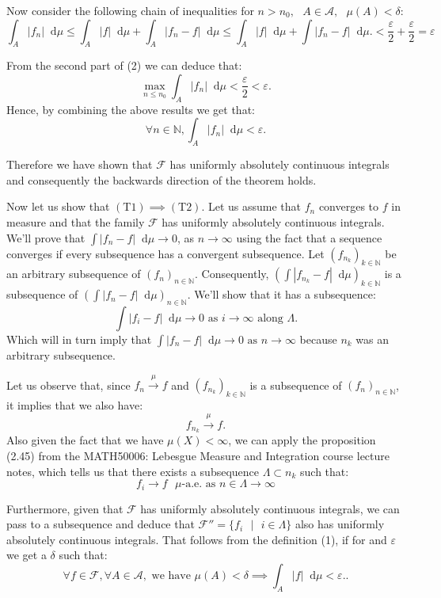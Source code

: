 \documentclass[11pt]{article}
\newcommand\st{\text{ } | \text{ }}
\newcommand\N{\mathbb{N}}
\newcommand\A{\mathcal{A}}
\newcommand\weh{\text{ we have }}
\newcommand\as{\text{ as }}
\newcommand\sep{\text{ }}
\newcommand*\diff{\mathop{}\!\mathrm{d}}
\begin{document}
Now consider the following chain of inequalities for $n > n_0,\sep A \in \A,\sep \mu(A) < \delta$:
\[
\int_A |f_n| \diff\mu \le \int_A |f| \diff\mu + \int_A |f_n - f| \diff\mu \le \int_A |f| \diff\mu + \int |f_n - f| \diff\mu. < \frac{\varepsilon}{2} + \frac{\varepsilon}{2} = \varepsilon\]

From the second part of (2) we can deduce that:
\[
\max_{n \le n_0}\int_A |f_n| \diff\mu < \frac{\varepsilon}{2} < \varepsilon
.\]
Hence, by combining the above results we get that:
\[
\forall n \in \N, \int_A |f_n| \diff\mu < \varepsilon
.\]

Therefore we have shown that $\mathcal{F}$ has uniformly absolutely continuous
integrals and consequently the backwards direction of the theorem holds.

Now let us show that $(\text{T}1) \implies (\text{T}2)$.
Let us assume that $f_n$ converges to $f$ in measure and that the family $\mathcal{F}$
has uniformly absolutely continuous integrals. We'll prove that
$\int |f_n - f| \diff\mu \to 0$, as $n \to \infty$ using the fact that a sequence
converges if every subsequence has a convergent subsequence.
Let $(f_{n_k})_{k\in\N}$ be an arbitrary subsequence of  $(f_{n})_{n\in\N}$.
Consequently, $(\int |f_{n_k} - f| \diff\mu)_{k\in\N}$ is a subsequence of
$(\int |f_{n} - f| \diff\mu)_{n\in\N}$. We'll show that it has a subsequence:
\[
  \int |f_{i} - f| \diff\mu \to 0 \as i \to \infty \text{ along } \Lambda
.\]
Which will in turn imply that $\int |f_{n} - f| \diff\mu \to 0 \as n \to \infty $
because $n_k$ was an arbitrary subsequence.

Let us observe that, since $f_n \xrightarrow{\mu} f$ and $(f_{n_k})_{k\in\N}$
is a subsequence of  $(f_{n})_{n\in\N}$, it implies that we also have:
\[
f_{n_k} \xrightarrow{\mu} f
.\]
Also given the fact that we have $\mu(X) < \infty$, we can apply the proposition
(2.45) from the MATH50006: Lebesgue Measure and Integration course lecture notes, which
tells us that there exists a subsequence $\Lambda \subset n_k$ such that:
\begin{equation}
  f_i \to f \text{ }\mu\text{-a.e.} \as n \in \Lambda \to \infty
\end{equation}

Furthermore, given that $\mathcal{F}$ has uniformly absolutely continuous integrals,
we can pass to a subsequence and deduce that  $\mathcal{F}'' = \lbrace f_i \st i \in \Lambda \rbrace$
also has uniformly absolutely continuous integrals. That follows from the definition
(1), if for and $\varepsilon$ we get a  $\delta$ such that:
\[
\forall f \in \mathcal{F},
  \forall A \in \mathcal{A}, \weh \mu(A) < \delta \implies \int_A |f|\diff \mu < \varepsilon.
.\]
\end{document}

